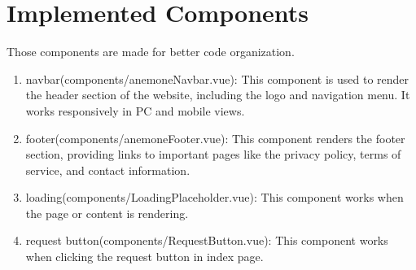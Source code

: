 
\section{Implemented Components}
Those components are made for better code organization.
\begin{enumerate}
	\item navbar(components/anemoneNavbar.vue): This component is used to render the header section of the website, including the logo and navigation menu. It works responsively in PC and mobile views.
	\item footer(components/anemoneFooter.vue): This component renders the footer section, providing links to important pages like the privacy policy, terms of service, and contact information.
	\item loading(components/LoadingPlaceholder.vue): This component works when the page or content is rendering.
	\item request button(components/RequestButton.vue): This component works when clicking the request button in index page.
\end{enumerate}